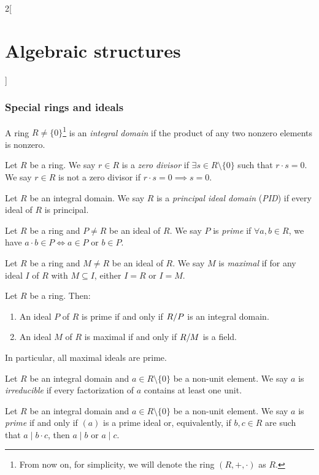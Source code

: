 \documentclass[../../../main_math.tex]{subfiles}
\begin{document}
\begin{multicols}{2}[\section{Algebraic structures}]
  \subsubsection{Special rings and ideals}
  \begin{definition}
    A ring $R\ne\{0\}$\footnote{From now on, for simplicity, we will denote the ring $(R,+,\cdot)$ as $R$.} is an \emph{integral domain} if the product of any two nonzero elements is nonzero.
  \end{definition}
  \begin{definition}
    Let $R$ be a ring. We say $r\in R$ is a \emph{zero divisor} if $\exists s\in R\setminus\{0\}$ such that $r\cdot s=0$. We say $r\in R$ is not a zero divisor if $r\cdot s=0\implies s=0$.
  \end{definition}
  \begin{definition}
    Let $R$ be an integral domain. We say $R$ is a \emph{principal ideal domain} (\emph{PID}) if every ideal of $R$ is principal.
  \end{definition}
  \begin{definition}
    Let $R$ be a ring and $P\ne R$ be an ideal of $R$. We say $P$ is \emph{prime} if $\forall a,b\in R$, we have $a\cdot b\in P\iff a\in P\text{ or }b\in P$.
  \end{definition}
  \begin{definition}
    Let $R$ be a ring and $M\ne R$ be an ideal of $R$. We say $M$ is \emph{maximal} if for any ideal $I$ of $R$ with $M\subseteq I$, either $I=R$ or $I=M$.
  \end{definition}
  \begin{proposition}
    Let $R$ be a ring. Then:
    \begin{enumerate}
      \item An ideal $P$ of $R$ is prime if and only if $\quot{R}{P}$ is an integral domain.
      \item An ideal $M$ of $R$ is maximal if and only if $\quot{R}{M}$ is a field.
    \end{enumerate}
    In particular, all maximal ideals are prime.
  \end{proposition}
  \begin{definition}
    Let $R$ be an integral domain and $a\in R\setminus\{0\}$ be a non-unit element. We say $a$ is \emph{irreducible} if every factorization of $a$ contains at least one unit.
  \end{definition}
  \begin{definition}\label{AS:primernumber}
    Let $R$ be an integral domain and $a\in R\setminus\{0\}$ be a non-unit element. We say $a$ is \emph{prime} if and only if $(a)$ is a prime ideal or, equivalently, if $b,c\in R$ are such that $a\mid b\cdot c$, then $a\mid b$ or $a\mid c$.

\end{definition}
\end{multicols}
\end{document}
